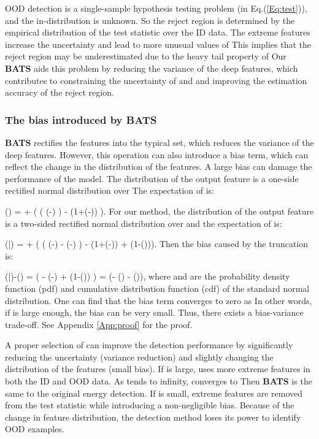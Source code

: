 \documentclass{article}
\newcommand{\benr}{}
\def\rvz{{\mathbf{z}}}
\newcommand{\E}{\mathbb{E}}
\begin{document}
OOD detection is a single-sample hypothesis testing problem (in Eq.(\ref{Eq:test})), and the in-distribution  is unknown.
So the reject region is determined by the empirical distribution of the test statistic  over the ID data.
The extreme features increase the uncertainty and lead to more unusual values of 
This implies that the reject region may be underestimated due to the heavy tail property of 
Our \textbf{BATS} aids this problem by reducing the variance of the deep features, which contributes to constraining the uncertainty of  and  and improving the estimation accuracy of the reject region. 

\subsubsection{The bias introduced by BATS}
\textbf{BATS} rectifies the features into the typical set, which reduces the variance of the deep features. However, this operation can also introduce a bias term, which can reflect the change in the distribution of the features. A large bias can damage the performance of the model.  The distribution of the output feature  is a one-side rectified normal distribution over  The expectation of  is:
\benr
\E(\rvz) = \mu + \sigma \Big( \big( \exp(-)  \big)   - \frac{\mu}{2\sigma}(1+(-)) \Big).
\eenr
For our method, the distribution of the output feature  is a {two-sided} rectified normal distribution over  and the expectation of  is:
\benr
\E(\bar \rvz) = \mu + \sigma \Big( \big( \exp(-) - \exp(-)  \big)   - \frac{\mu}{2\sigma}(1+(-)) +  (1-())\Big).
\eenr
Then the bias caused by the truncation is:
\benr
\E(\bar \rvz)-\E(\rvz) = \sigma\Big( - \exp(-) +  (1-()) \Big) = \big(\lambda - \lambda \Phi(\lambda) - \phi(\lambda)\big)\sigma,
\eenr
where  and  are the probability density function (pdf) and cumulative distribution function (cdf) of the standard normal distribution. One can find that the bias term  converges to zero as  In other words, if  is large enough, the bias can be very small. Thus, there exists a bias-variance trade-off. See Appendix \ref{App:proof} for the proof.

A proper selection of  can improve the detection performance by significantly reducing the uncertainty (variance reduction) and slightly changing the distribution of the features (small bias). 
If  is large,  uses more extreme features in both the ID and OOD data.
As  tends to infinity,   converges to 
Then \textbf{BATS} is the same to the original energy detection.
If  is small, extreme features are removed from the test statistic  while introducing a non-negligible bias.
Because of the change in feature distribution, the detection method loses its power to identify OOD examples.
\end{document}
